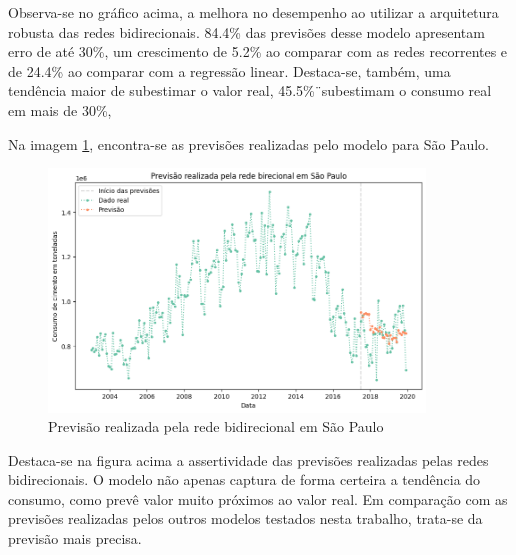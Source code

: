 Observa-se no gráfico acima, a melhora no desempenho ao utilizar a arquitetura 
robusta das redes bidirecionais. 84.4\% das previsões desse modelo apresentam 
erro de até 30\%, um crescimento de 5.2\% ao comparar com as redes recorrentes 
e de 24.4\% ao comparar com a regressão linear. Destaca-se, também, uma tendência
maior de subestimar o valor real, 45.5\%¨subestimam o consumo real em mais de 
30\%,

Na imagem \ref{img:consumo-sp-bnn}, encontra-se as previsões realizadas pelo 
modelo para São Paulo.

\begin{figure}[H]
    \centering
    \includegraphics[width=10cm]{../figuras/graficos/bi/prev-sp-bi.png}
    \caption{Previsão realizada pela rede bidirecional em São Paulo}
    \label{img:consumo-sp-bnn}
\end{figure}

Destaca-se na figura acima a assertividade das previsões realizadas pelas 
redes bidirecionais. O modelo não apenas captura de forma certeira a tendência 
do consumo, como prevê valor muito próximos ao valor real. Em comparação com 
as previsões realizadas pelos outros modelos testados nesta trabalho, trata-se 
da previsão mais precisa.